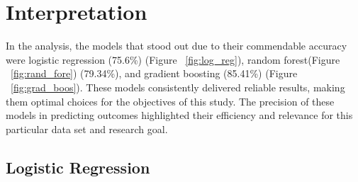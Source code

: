 \section{Interpretation}
	In the analysis, the models that stood out due to their commendable accuracy were logistic regression (75.6\%)
	(Figure ~\ref{fig:log_reg}), random forest(Figure ~\ref{fig:rand_fore}) (79.34\%), and gradient boosting (85.41\%)
	(Figure ~\ref{fig:grad_boos}). These models consistently delivered reliable results, making them optimal choices
	for the objectives of this study. The precision of these models in predicting outcomes highlighted their
	efficiency and relevance for this particular data set and research goal.

	\subsection{Logistic Regression}

